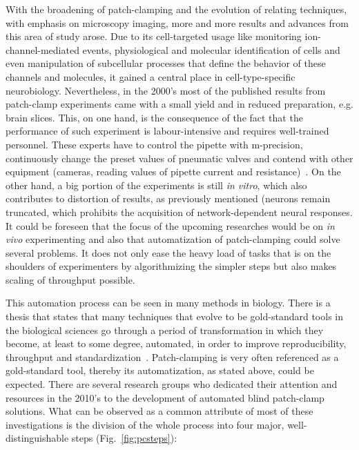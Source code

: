 \documentclass[12pt,a4paper]{report}
\begin{document}
With the broadening of patch-clamping and the evolution of relating techniques, with emphasis on microscopy imaging, more and more results and advances from this area of study arose. Due to its cell-targeted usage like monitoring ion-channel-mediated events, physiological and molecular identification of cells and even manipulation of subcellular processes that define the behavior of these channels and molecules, it gained a central place in cell-type-specific neurobiology. Nevertheless, in the 2000's most of the published results from patch-clamp experiments came with a small yield and in reduced preparation, e.g. brain slices. This, on one hand, is the consequence of the fact that the performance of such experiment is labour-intensive and requires well-trained personnel. These experts have to control the pipette with \textmu m-precision, continuously change the preset values of pneumatic valves and contend with other equipment (cameras, reading values of pipette current and resistance)~\cite{desai2015}. On the other hand, a big portion of the experiments is still \textit{in vitro}, which also contributes to distortion of results, as previously mentioned (neurons remain truncated, which prohibits the acquisition of network-dependent neural responses. It could be foreseen that the focus of the upcoming researches would be on \textit{in vivo} experimenting and also that automatization of patch-clamping could solve several problems. It does not only ease the heavy load of tasks that is on the shoulders of experimenters by algorithmizing the simpler steps but also makes scaling of throughput possible.\par
This automation process can be seen in many methods in biology. There is a thesis that states that many techniques that evolve to be gold-standard tools in the biological sciences go through a period of transformation in which they become, at least to some degree, automated, in order to improve reproducibility, throughput and standardization~\cite{suk2019}. Patch-clamping is very often referenced as a gold-standard tool, thereby its automatization, as stated above, could be expected. There are several research groups who dedicated their attention and resources in the 2010's to the development of automated blind patch-clamp solutions. What can be observed as a common attribute of most of these investigations is the division of the whole process into four major, well-distinguishable steps (Fig.~\ref{fig:pcsteps}):
\end{document}
